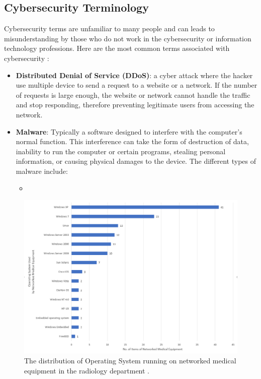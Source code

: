 \documentclass[pdf,bookmarks,colorlinks=true]{IEEEtran}
\begin{document}
\subsection{Cybersecurity Terminology}
Cybersecurity terms are unfamiliar to many people and can leads to misunderstanding by those who do not work in the cybersecurity or information technology professions. Here are the most common terms associated with cybersecurity \cite{ferrara2019cybersecurity}:
\begin{itemize}
	\item {\bf Distributed Denial of Service (DDoS)}: a cyber attack where the hacker use multiple device to send a request to a website or a network. If the number of requests is large enough, the website or network cannot handle the traffic and stop responding, therefore preventing legitimate users from accessing the network.
	\item {\bf Malware}: Typically a software designed to interfere with the computer's normal function. This interference can take the form of destruction of data, inability to run the computer or certain programs, stealing personal information, or causing physical damages to the device. The different types of malware include:
	\begin{itemize}
		\item 
		
	\end{itemize}
\end{itemize}


\begin{figure}[tp]
	\centering
	\includegraphics[width=0.7\linewidth]{OSonRadiology}
	\caption{The distribution of Operating System running on networked medical equipment in the radiology department \cite{moses2015lack}.}
	\label{fig:osonradiology}
\end{figure}

 
\end{document}
